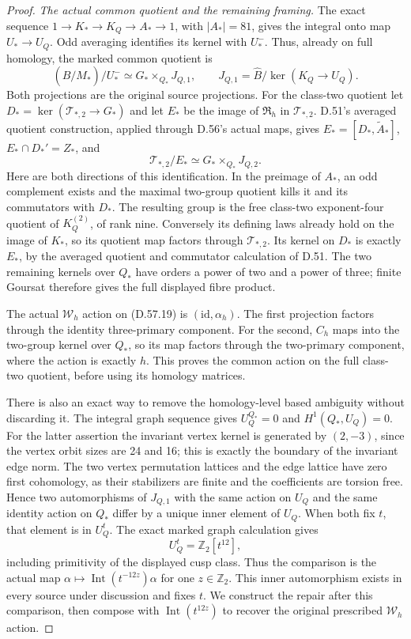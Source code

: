 \begin{proof}
\emph{The actual common quotient and the remaining framing.}
The exact sequence
\(1\to K_*\to K_Q\to A_*\to1\), with \(|A_*|=81\),
gives the integral onto map \(U_*\to U_Q\).
Odd averaging identifies its kernel with \(U_*^-\).
Thus, already on full homology, the marked common quotient
is
\[
 (\widehat B/M_*)/U_*^-
       \simeq G_*\mathbin{\times}_{Q_*}J_{Q,1},
 \qquad J_{Q,1}=\widehat B/\ker(K_Q\to U_Q).
 \tag{D.57.18}
\]
Both projections are the original source projections.
For the class-two quotient let \(D_*=\ker(\mathcal T_{*,2}
\to G_*)\) and let \(E_*\) be the image of
\(\mathfrak R_h\) in \(\mathcal T_{*,2}\).
D.51's averaged quotient construction, applied through
D.56's actual maps, gives
\(E_*=[D_*,\widetilde A_*]\),
\(E_*\cap D_*'=Z_*\), and
\[
 \mathcal T_{*,2}/E_*
        \simeq G_*\mathbin{\times}_{Q_*}J_{Q,2}.
 \tag{D.57.19}
\]
Here are both directions of this identification. In the
preimage of \(A_*\), an odd complement exists and the
maximal two-group quotient kills it and its commutators
with \(D_*\). The resulting group is the free class-two
exponent-four quotient of \(K_Q^{(2)}\), of rank nine.
Conversely its defining laws already hold on the image
of \(K_*\), so its quotient map factors through
\(\mathcal T_{*,2}\). Its kernel on \(D_*\) is exactly
\(E_*\), by the averaged quotient and commutator calculation
of D.51. The two remaining kernels over \(Q_*\) have
orders a power of two and a power of three; finite Goursat
therefore gives the full displayed fibre product.

The actual \(\mathcal W_h\) action on (D.57.19) is
\((\mathrm{id},\alpha_h)\). The first projection factors
through the identity three-primary component. For the
second, \(C_h\) maps into the two-group kernel over
\(Q_*\), so its map factors through the two-primary
component, where the action is exactly \(h\).
This proves the common action on the full class-two
quotient, before using its homology matrices.

There is also an exact way to remove the homology-level
based ambiguity without discarding it. The integral graph
sequence gives
\(U_Q^{Q_*}=0\) and \(H^1(Q_*,U_Q)=0\).
For the latter assertion the invariant vertex kernel is
generated by \((2,-3)\), since the vertex orbit sizes
are 24 and 16; this is exactly the boundary of the
invariant edge norm. The two vertex permutation lattices
and the edge lattice have zero first cohomology, as their
stabilizers are finite and the coefficients are torsion
free. Hence two automorphisms of \(J_{Q,1}\) with the
same action on \(U_Q\) and the same identity action on
\(Q_*\) differ by a unique inner element of \(U_Q\).
When both fix \(t\), that element is in \(U_Q^t\).
The exact marked graph calculation gives
\[
                 U_Q^t=\mathbb Z_2[t^{12}],
 \tag{D.57.20}
\]
including primitivity of the displayed cusp class.
Thus the comparison is the actual map
\(\alpha\mapsto\operatorname{Int}(t^{-12z})\alpha\)
for one \(z\in\mathbb Z_2\). This inner automorphism
exists in every source under discussion and fixes \(t\).
We construct the repair after this comparison, then
compose with \(\operatorname{Int}(t^{12z})\) to recover
the original prescribed \(\mathcal W_h\) action.


\end{proof}
